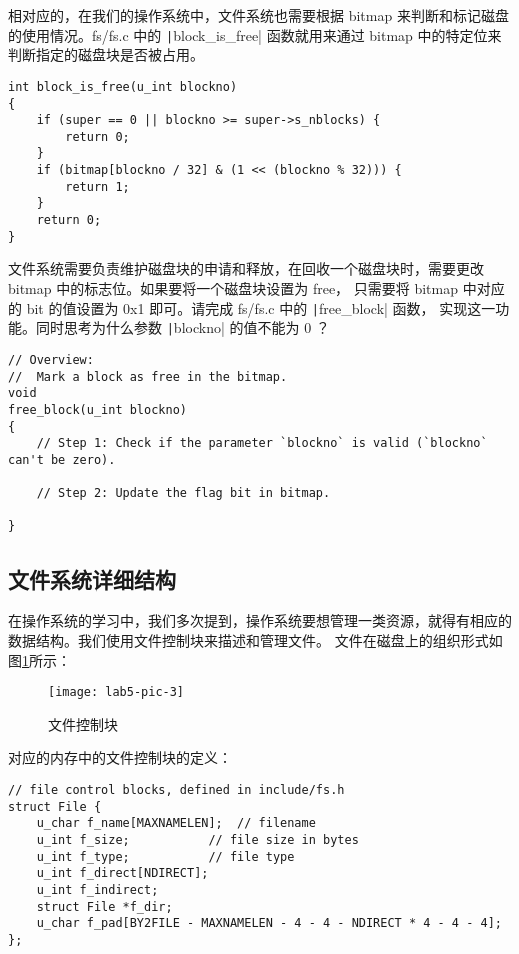 相对应的，在我们的操作系统中，文件系统也需要根据 bitmap 来判断和标记磁盘的使用情况。fs/fs.c 中的 \texttt|block_is_free|
函数就用来通过 bitmap 中的特定位来判断指定的磁盘块是否被占用。

\begin{verbatim}
int block_is_free(u_int blockno)
{
    if (super == 0 || blockno >= super->s_nblocks) {
        return 0;
    }
    if (bitmap[blockno / 32] & (1 << (blockno % 32))) {
        return 1;
    }
    return 0;
}
\end{verbatim}

\begin{exercise}
文件系统需要负责维护磁盘块的申请和释放，在回收一个磁盘块时，需要更改 bitmap 中的标志位。如果要将一个磁盘块设置为 free，
只需要将 bitmap 中对应的 bit 的值设置为 0x1 即可。请完成 fs/fs.c 中的 \texttt|free_block| 函数，
实现这一功能。同时思考为什么参数 \texttt|blockno| 的值不能为 0 ？

\begin{verbatim}
// Overview:
//  Mark a block as free in the bitmap.
void
free_block(u_int blockno)
{
    // Step 1: Check if the parameter `blockno` is valid (`blockno` can't be zero). 

    // Step 2: Update the flag bit in bitmap.

}
\end{verbatim}

\end{exercise}

\subsection{文件系统详细结构}

在操作系统的学习中，我们多次提到，操作系统要想管理一类资源，就得有相应的数据结构。我们使用文件控制块来描述和管理文件。
文件在磁盘上的组织形式如图\ref{lab5-pic-3}所示：

\begin{figure}[htbp]
  \centering
  \texttt{[image: lab5-pic-3]}
  \caption{文件控制块}\label{lab5-pic-3}
\end{figure}

对应的内存中的文件控制块的定义：

\begin{verbatim}
// file control blocks, defined in include/fs.h
struct File {
    u_char f_name[MAXNAMELEN];  // filename
    u_int f_size;           // file size in bytes
    u_int f_type;           // file type
    u_int f_direct[NDIRECT];
    u_int f_indirect;
    struct File *f_dir;
    u_char f_pad[BY2FILE - MAXNAMELEN - 4 - 4 - NDIRECT * 4 - 4 - 4];
};
\end{verbatim}


